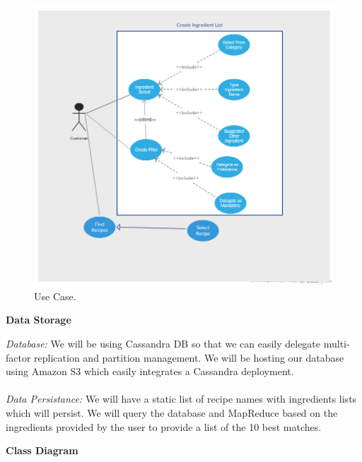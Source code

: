 \documentclass[12pt]{article}
\begin{document}
\begin{center}
\begin{figure}
\includegraphics[width=\linewidth]{UseCase.png}
\caption{Use Case.}
\label{fig:UseCase}
\end{figure}
\end{center}
\newpage
\begin{center}
  \textbf{Data Storage}
\end{center}
\textit{Database: } We will be using Cassandra DB so that we can easily delegate multi-factor replication and partition management. We will be hosting our database using
Amazon S3 which easily integrates a Cassandra deployment. \\
\vspace{1cm} \\
\textit{Data Persistance: } We will have a static list of recipe names with ingredients lists which will persist. We will query the database and MapReduce based on the ingredients
provided by the user to provide a list of the 10 best matches.

\newpage
\begin{center}
  \textbf{Class Diagram}
\end{center}
\end{document}
